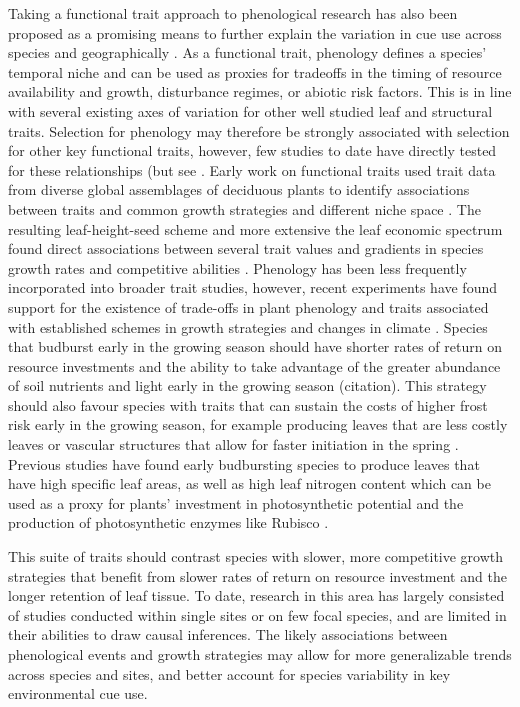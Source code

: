 \documentclass{article}\usepackage[]{graphicx}\usepackage[]{color}
\begin{document}
Taking a functional trait approach to phenological research has also been proposed as a promising means to further explain the variation in cue use across species and geographically \citep{Flynn2018,Osada2017}. As a functional trait, phenology defines a species' temporal niche and can be used as proxies for tradeoffs in the timing of resource availability and growth, disturbance regimes, or abiotic risk factors. This is in line with several existing axes of variation for other well studied leaf and structural traits. Selection for phenology may therefore be strongly associated with selection for other key functional traits, however, few studies to date have directly tested for these relationships (but see \citep{Osada2017,Sun2006,Lechowicz1984}. Early work on functional traits used trait data from diverse global assemblages of deciduous plants to identify associations between traits and common growth strategies and different niche space \citep{Westoby1998,Wright2004,Chave2009}. The resulting leaf-height-seed scheme and more extensive the leaf economic spectrum found direct associations between several trait values and gradients in species growth rates and competitive abilities \citep{Westoby1998,Wright2004,Diaz2016,Chave2009,Funk2016}. Phenology has been less frequently incorporated into broader trait studies, however, recent experiments have found support for the existence of trade-offs in plant phenology and traits associated with established schemes in growth strategies and changes in climate \citep{Suzuki1997,Ishioka2013}. Species that budburst early in the growing season should have shorter rates of return on resource investments and the ability to take advantage of the greater abundance of soil nutrients and light early in the growing season (citation). This strategy should also favour species with traits that can sustain the costs of higher frost risk early in the growing season, for example producing leaves that are less costly leaves or vascular structures that allow for faster initiation in the spring \citep{Lechowicz1984,Lenz2016}. Previous studies have found early budbursting species to produce leaves that have high specific leaf areas, as well as high leaf nitrogen content which can be used as a proxy for plants' investment in photosynthetic potential and the production of photosynthetic enzymes like Rubisco \citep{Pereira2020}. %

This suite of traits should contrast species with slower, more competitive growth strategies that benefit from slower rates of return on resource investment and the longer retention of leaf tissue. To date, research in this area has largely consisted of studies conducted within single sites or on few focal species, and are limited in their abilities to draw causal inferences. The likely associations between phenological events and growth strategies may allow for more generalizable trends across species and sites, and better account for species variability in key environmental cue use. 
 
\end{document}
